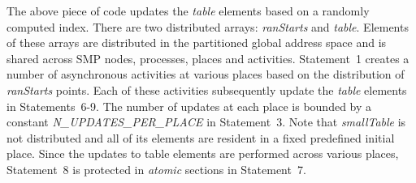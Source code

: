 The above piece of code updates the {\it table} elements based on a 
randomly computed index. There are two distributed \Xten{} arrays:
{\it ranStarts} and {\it table}. Elements of these arrays are
distributed in the partitioned global address space and is shared
across  SMP nodes, \Xten{} processes, \Xten{} places and \Xten{} 
activities.  Statement~1 creates a number of 
asynchronous activities at various places based on the distribution of 
{\it ranStarts} points. Each of these activities subsequently update
the {\it table} elements in Statements~6-9. The number of updates at 
each place is bounded by a constant {\it N\_UPDATES\_PER\_PLACE} in
Statement~3. Note that {\it smallTable} is not distributed and all 
of its elements are resident in a fixed predefined initial place.
Since the updates to table elements are performed across various \Xten{}
places, Statement~8 is protected in {\it atomic} sections in
Statement~7.

